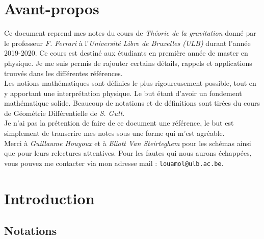 \documentclass[a4paper,11pt]{report}
\begin{document}


\nocite{weinberg}
\nocite{wheeler}
\nocite{hawking}
\nocite{hartle}
\nocite{price}
\nocite{nakahara}
\nocite{wald}
\nocite{lee}
\nocite{gutt}

\chapter*{Avant-propos}

    Ce document reprend mes notes du cours de \textit{Théorie de la gravitation} donné par le professeur \textit{F. Ferrari} à l'\textit{Université Libre de Bruxelles (ULB)} durant l'année 2019-2020. Ce cours est destiné aux étudiants en première année de master en physique. Je me suis permis de rajouter certains détails, rappels et applications trouvés dans les différentes références.\\
    
    Les notions mathématiques sont définies le plus rigoureusement possible, tout en y apportant une interprétation physique. Le but étant d'avoir un fondement mathématique solide. Beaucoup de notations et de définitions sont tirées du cours de Géométrie Différentielle de \textit{S. Gutt}. \\
    
    Je n'ai pas la prétention de faire de ce document une référence, le but est simplement de transcrire mes notes sous une forme qui m'est agréable.\\
    
    Merci à \textit{Guillaume Houyoux} et à \textit{Eliott Van Steirteghem} pour les schémas ainsi que pour leurs relectures attentives. Pour les fautes qui nous aurons échappées, vous pouvez me contacter via mon adresse mail : \verb?louamol@ulb.ac.be?.\\
    

\printbibliography[title=Références]
\pagebreak
\tableofcontents
\pagebreak

\chapter{Introduction}

    \section*{Notations}
    
\end{document}

